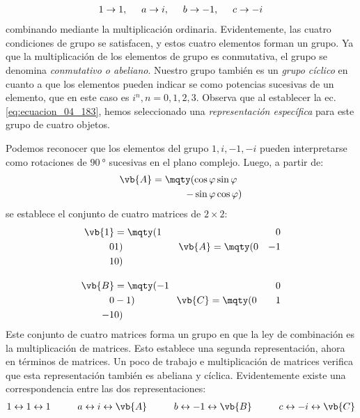 \begin{align}
1 \to 1, \hspace{0.5cm} a \to i, \hspace{0.5cm} b \to -1, \hspace{0.5cm} c \to -i
\label{eq:ecuacion_04_183}
\end{align}
combinando mediante la multiplicación ordinaria. Evidentemente, las cuatro condiciones de grupo se satisfacen, y estos cuatro elementos forman un grupo. Ya que la multiplicación de los elementos de grupo es conmutativa, el grupo se denomina \emph{conmutativo o abeliano}. Nuestro grupo también es un \emph{grupo cíclico} en cuanto a que los elementos pueden indicar­ se como potencias sucesivas de un elemento, que en este caso es $i^{n}, n = 0, 1, 2, 3$. Observa que al establecer la ec. \ref{eq:ecuacion_04_183}, hemos seleccionado una \emph{representación específica} para este grupo de cuatro objetos.
\par
Podemos reconocer que los elementos del grupo $1, i, -1, -i$ pueden interpretarse como rotaciones de $\SI{90}{\degree}$ sucesivas en el plano complejo. Luego, a partir de:
\begin{align}
\vb{A} = \mqty(
\cos \varphi & \sin \varphi \\
-\sin \varphi & \cos \varphi )
\end{align}
se establece el conjunto de cuatro matrices de $2 \times 2$:
\begin{align}
\begin{aligned}
\vb{1} &= \mqty(
1 & 0 \\
0 & 1 ) \hspace{2cm} \vb{A} = \mqty(
0 & -1 \\
1 & 0 ) \\[1em]
\vb{B} &= \mqty(
-1 & 0 \\
0 & -1 ) \hspace{1.5cm} \vb{C} = \mqty(
0 & 1 \\
-1 & 0 )
\end{aligned}
\label{eq_ecuacion_04_184}
\end{align}
Este conjunto de cuatro matrices forma un grupo en que la ley de combinación es la multiplicación de matrices. Esto establece una segunda representación, ahora en términos de matrices. Un poco de trabajo e multiplicación de matrices verifica que esta representación también es abeliana y cíclica. Evidentemente existe una correspondencia entre las dos representaciones:
\begin{align}
1 \leftrightarrow 1 \leftrightarrow 1 \hspace{1cm}  a \leftrightarrow i \leftrightarrow \vb{A} \hspace{1cm}  b \leftrightarrow -1 \leftrightarrow \vb{B} \hspace{1cm} c \leftrightarrow -i \leftrightarrow \vb{C}
\end{align} 

